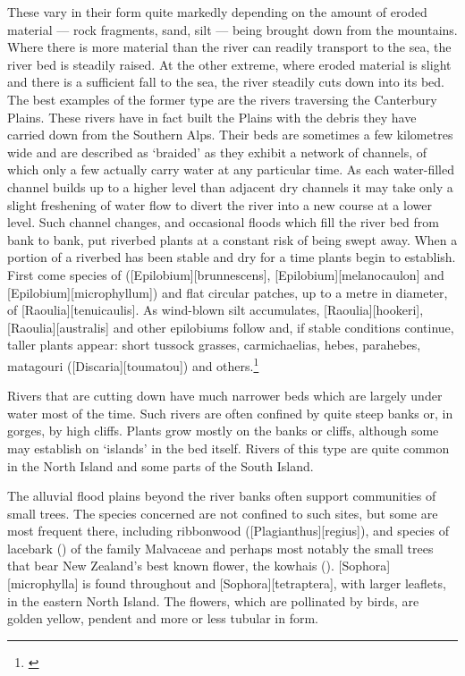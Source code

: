 These vary in their form quite markedly depending on the amount of eroded material --- rock fragments, sand, silt --- being brought down from the mountains.
Where there is more material than the river can readily transport to the sea, the river bed is steadily raised.
At the other extreme, where eroded material is slight and there is a sufficient fall to the sea, the river steadily cuts down into its bed.
The best examples of the former type are the rivers traversing the Canterbury Plains.
These rivers have in fact built the Plains with the debris they have carried down from the Southern Alps.
Their beds are sometimes a few kilometres wide and are described as `braided' as they exhibit a network of channels, of which only a few actually carry water at any particular time.
As each water-filled channel builds up to a higher level than adjacent dry channels it may take only a slight freshening of water flow to divert the river into a new course at a lower level.
Such channel changes, and occasional floods which fill the river bed from bank to bank, put riverbed plants at a constant risk of being swept away.
When a portion of a riverbed has been stable and dry for a time plants begin to establish.
First come species of  ([Epilobium][brunnescens], [Epilobium][melanocaulon] and [Epilobium][microphyllum]) and flat circular patches, up to a metre in diameter, of [Raoulia][tenuicaulis].
As wind-blown silt accumulates, [Raoulia][hookeri], [Raoulia][australis] and other epilobiums follow and, if stable conditions continue, taller plants appear: short tussock grasses, carmichaelias, hebes, parahebes, matagouri ([Discaria][toumatou]) and others.\footnote{\cite{calder1961plant}}

Rivers that are cutting down have much narrower beds which are largely under water most of the time.
Such rivers are often confined by quite steep banks or, in gorges, by high cliffs.
Plants grow mostly on the banks or cliffs, although some may establish on `islands' in the bed itself.
Rivers of this type are quite common in the North Island and some parts of the South Island.

The alluvial flood plains beyond the river banks often support communities of small trees.
The species concerned are not confined to such sites, but some are most frequent there, including ribbonwood ([Plagianthus][regius]), and species of lacebark () of the family Malvaceae and perhaps most notably the small trees that bear New Zealand's best known flower, the kowhais ().  [Sophora][microphylla] is found throughout and [Sophora][tetraptera], with larger leaflets, in the eastern North Island.
The flowers, which are pollinated by birds, are golden yellow, pendent and more or less tubular in form.

